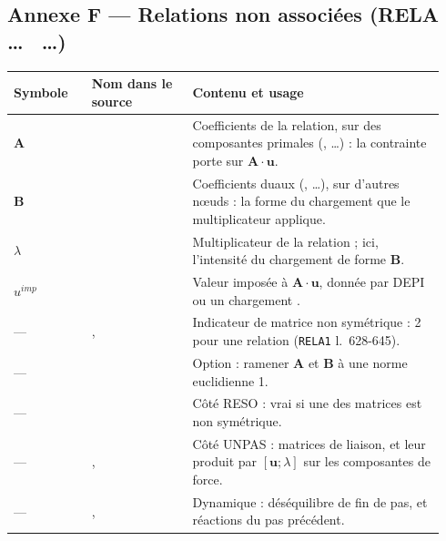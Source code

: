 \documentclass[11pt,a4paper]{article}
\makeatletter
\numberwithin{equation}{section}
\newcommand{\src}[1]{\texttt{\detokenize{#1}}}          %
\newcommand{\pr}[1]{\textsf{#1}}                        %
\newcommand{\op}[1]{\textsf{\small #1}}                 %
\newcommand{\lig}[1]{l.~#1}
\newcommand{\vc}[1]{\symbf{#1}}                         %
\newenvironment{glossaire}[1][Glossaire]{%
  \par\smallskip\needspace{7\baselineskip}\noindent{\sffamily\bfseries\small #1}\par\nopagebreak
  \small
  \renewcommand{\arraystretch}{1.18}
  \begin{longtable}{@{}>{\raggedright\arraybackslash}p{0.17\linewidth}
                     >{\raggedright\arraybackslash}p{0.22\linewidth}
                     >{\raggedright\arraybackslash}p{0.555\linewidth}@{}}
  \toprule
  \textbf{Symbole} & \textbf{Nom dans le source} & \textbf{Contenu et usage}\\
  \midrule\endhead
  \bottomrule\endfoot}
  {\end{longtable}\addtocounter{table}{-1}\normalsize\vspace{-0.4em}}
\makeatother
\begin{document}
\subsection{Annexe F — Relations non associées (\op{RELA} \dots\ \src{'DUAL'} \dots)}

\begin{glossaire}
$\vc A$ & \src{CHP1} & Coefficients de la relation, sur des composantes primales (\src{UX}, \src{UY}…) : la contrainte porte sur $\vc A\cdot\vc u$.\\
$\vc B$ & \src{CHP2} & Coefficients duaux (\src{FX}, \src{FY}…), sur d'autres nœuds : la forme du chargement que le multiplicateur applique.\\
$\lambda$ & \src{LX} & Multiplicateur de la relation ; ici, l'intensité du chargement de forme $\vc B$.\\
$u^{imp}$ & \src{FLX} & Valeur imposée à $\vc A\cdot\vc u$, donnée par \op{DEPI} ou un chargement \src{DIMP}.\\
— & \src{SYMRE}, \src{IRIGEL(7)} & Indicateur de matrice non symétrique : 2 pour une relation \src{DUAL} (\texttt{RELA1} \lig{628-645}).\\
— & \src{NORM} & Option : ramener $\vc A$ et $\vc B$ à une norme euclidienne 1.\\
— & \src{INSYM} & Côté \op{RESO} : vrai si une des matrices est non symétrique.\\
— & \src{ZCLIM}, \src{FCORF} & Côté \pr{UNPAS} : matrices de liaison, et leur produit par $[\vc u ; \lambda]$ sur les composantes de force.\\
— & \src{FOPL}, \src{REAPREC} & Dynamique : déséquilibre de fin de pas, et réactions du pas précédent.\\
\end{glossaire}
\end{document}
